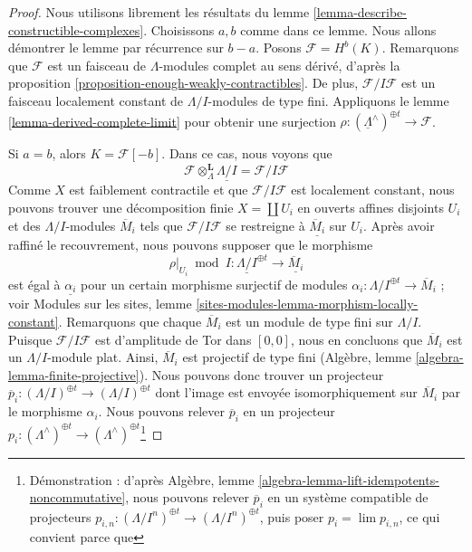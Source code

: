 \begin{proof}
Nous utilisons librement les résultats du
lemme \ref{lemma-describe-constructible-complexes}.
Choisissons $a, b$ comme dans ce lemme. Nous allons démontrer le lemme par
récurrence sur $b - a$. Posons $\mathcal{F} = H^b(K)$.
Remarquons que $\mathcal{F}$ est un faisceau de
$\Lambda$-modules complet au sens dérivé, d'après la
proposition \ref{proposition-enough-weakly-contractibles}.
De plus, $\mathcal{F}/I\mathcal{F}$ est un faisceau localement
constant de $\Lambda/I$-modules de type fini.
Appliquons le lemme \ref{lemma-derived-complete-limit} pour obtenir une surjection
$\rho : (\underline{\Lambda}^\wedge)^{\oplus t} \to \mathcal{F}$.

\medskip\noindent
Si $a = b$, alors $K = \mathcal{F}[-b]$. Dans ce cas, nous voyons que
$$
\mathcal{F} \otimes_\Lambda^\mathbf{L} \underline{\Lambda/I} =
\mathcal{F}/I\mathcal{F}
$$
Comme $X$ est faiblement contractile et que $\mathcal{F}/I\mathcal{F}$ est
localement constant, nous pouvons trouver une décomposition finie
$X = \coprod U_i$ en ouverts affines disjoints $U_i$
et des $\Lambda/I$-modules $\overline{M}_i$
tels que $\mathcal{F}/I\mathcal{F}$ se restreigne à
$\underline{\overline{M}_i}$ sur $U_i$. Après avoir raffiné le recouvrement,
nous pouvons supposer que le morphisme
$$
\rho|_{U_i} \bmod I :
\underline{\Lambda/I}^{\oplus t}
\longrightarrow
\underline{\overline{M}_i}
$$
est égal à $\underline{\alpha_i}$ pour un certain morphisme surjectif de modules
$\alpha_i : \Lambda/I^{\oplus t} \to \overline{M}_i$ ; voir
Modules sur les sites, lemme \ref{sites-modules-lemma-morphism-locally-constant}.
Remarquons que chaque $\overline{M}_i$ est un module de type fini sur $\Lambda/I$.
Puisque $\mathcal{F}/I\mathcal{F}$ est d'amplitude de Tor dans $[0, 0]$,
nous en concluons que $\overline{M}_i$ est un $\Lambda/I$-module plat.
Ainsi, $\overline{M}_i$ est projectif de type fini
(Algèbre, lemme \ref{algebra-lemma-finite-projective}).
Nous pouvons donc trouver un projecteur
$\overline{p}_i : (\Lambda/I)^{\oplus t} \to (\Lambda/I)^{\oplus t}$
dont l'image est envoyée isomorphiquement sur $\overline{M}_i$ par le morphisme $\alpha_i$.
Nous pouvons relever $\overline{p}_i$ en un projecteur
$p_i : (\Lambda^\wedge)^{\oplus t} \to
(\Lambda^\wedge)^{\oplus t}$\footnote{Démonstration : d'après
Algèbre, lemme \ref{algebra-lemma-lift-idempotents-noncommutative},
nous pouvons relever $\overline{p}_i$ en un système compatible de
projecteurs $p_{i, n} : (\Lambda/I^n)^{\oplus t} \to (\Lambda/I^n)^{\oplus t}$,
puis poser $p_i = \lim p_{i, n}$, ce qui convient parce que
}
\end{proof}
